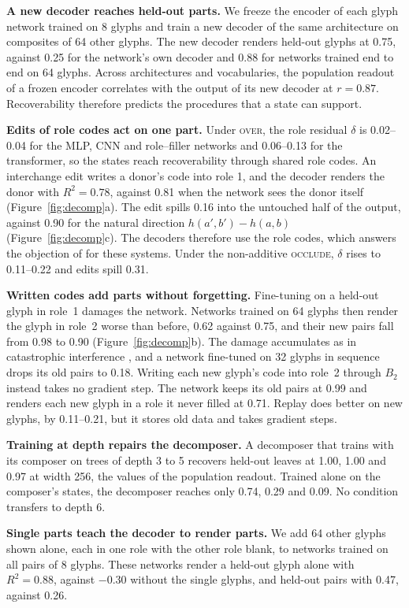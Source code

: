 \textbf{A new decoder reaches held-out parts.} We freeze the encoder of each glyph network trained on 8 glyphs and train a new decoder of the same architecture on composites of 64 other glyphs. The new decoder renders held-out glyphs at 0.75, against 0.25 for the network's own decoder and 0.88 for networks trained end to end on 64 glyphs. Across architectures and vocabularies, the population readout of a frozen encoder correlates with the output of its new decoder at $r = 0.87$. Recoverability therefore predicts the procedures that a state can support.

\textbf{Edits of role codes act on one part.} Under \textsc{over}, the role residual $\delta$ is 0.02--0.04 for the MLP, CNN and role--filler networks and 0.06--0.13 for the transformer, so the states reach recoverability through shared role codes. An interchange edit writes a donor's code into role 1, and the decoder renders the donor with $R^2 = 0.78$, against 0.81 when the network sees the donor itself (Figure~\ref{fig:decomp}a). The edit spills 0.16 into the untouched half of the output, against 0.90 for the natural direction $h(a', b') - h(a, b)$ (Figure~\ref{fig:decomp}c). The decoders therefore use the role codes, which answers the objection of \citet{fodor1990} for these systems. Under the non-additive \textsc{occlude}, $\delta$ rises to 0.11--0.22 and edits spill 0.31.

\textbf{Written codes add parts without forgetting.} Fine-tuning on a held-out glyph in role~1 damages the network. Networks trained on 64 glyphs then render the glyph in role~2 worse than before, 0.62 against 0.75, and their new pairs fall from 0.98 to 0.90 (Figure~\ref{fig:decomp}b). The damage accumulates as in catastrophic interference \citep{mccloskey1989}, and a network fine-tuned on 32 glyphs in sequence drops its old pairs to 0.18. Writing each new glyph's code into role~2 through $B_2$ instead takes no gradient step. The network keeps its old pairs at 0.99 and renders each new glyph in a role it never filled at 0.71. Replay does better on new glyphs, by 0.11--0.21, but it stores old data and takes gradient steps.

\textbf{Training at depth repairs the decomposer.} A decomposer that trains with its composer on trees of depth 3 to 5 recovers held-out leaves at 1.00, 1.00 and 0.97 at width 256, the values of the population readout. Trained alone on the composer's states, the decomposer reaches only 0.74, 0.29 and 0.09. No condition transfers to depth 6.

\textbf{Single parts teach the decoder to render parts.} We add 64 other glyphs shown alone, each in one role with the other role blank, to networks trained on all pairs of 8 glyphs. These networks render a held-out glyph alone with $R^2 = 0.88$, against $-0.30$ without the single glyphs, and held-out pairs with 0.47, against 0.26.

